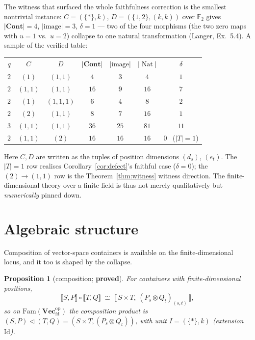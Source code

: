 \documentclass[11pt]{article}
\theoremstyle{plain}
\newtheorem{proposition}{Proposition}
\theoremstyle{definition}
\theoremstyle{remark}
\newcommand{\Vecfd}{\mathbf{Vec}_{\mathrm{fd}}}
\newcommand{\Fam}{\mathrm{Fam}}
\newcommand{\Cont}{\mathbf{Cont}}
\newcommand{\ext}[1]{\llbracket #1 \rrbracket}
\renewcommand{\lhd}{\vartriangleleft}
\newcommand{\op}{\mathrm{op}}
\DeclareMathOperator{\Nat}{Nat}
\begin{document}
The witness that surfaced the whole faithfulness correction is the smallest nontrivial instance:
$C=(\{\ast\},k)$, $D=(\{1,2\},(k,k))$ over $\mathbb F_2$ gives $|\Cont|=4$, $|\mathrm{image}|=3$,
$\delta=1$ --- two of the four morphisms (the two zero maps with $u=1$ vs.\ $u=2$) collapse to one
natural transformation (Langer, Ex.~5.4). A sample of the verified table:

\begin{center}\small
\renewcommand{\arraystretch}{1.15}
\begin{tabular}{@{}c c c c c c c@{}}
\toprule
$q$ & $C$ & $D$ & $|\Cont|$ & $|\mathrm{image}|$ & $|\Nat|$ & $\delta$\\
\midrule
$2$ & $(1)$   & $(1,1)$   & $4$  & $3$  & $4$  & $1$\\
$2$ & $(1,1)$ & $(1,1)$   & $16$ & $9$  & $16$ & $7$\\
$2$ & $(1)$   & $(1,1,1)$ & $6$  & $4$  & $8$  & $2$\\
$2$ & $(2)$   & $(1,1)$   & $8$  & $7$  & $16$ & $1$\\
$3$ & $(1,1)$ & $(1,1)$   & $36$ & $25$ & $81$ & $11$\\
$2$ & $(1,1)$ & $(2)$     & $16$ & $16$ & $16$ & $0$ \ ($|T|{=}1$)\\
\bottomrule
\end{tabular}
\end{center}

\noindent Here $C,D$ are written as the tuples of position dimensions $(d_s)$, $(e_t)$. The
$|T|=1$ row realises Corollary~\ref{cor:defect}'s faithful case ($\delta=0$); the $(2)\to(1,1)$
row is the Theorem~\ref{thm:witness} witness direction. The finite-dimensional theory over a
finite field is thus not merely qualitatively but \emph{numerically} pinned down.

\section{Algebraic structure}
\label{sec:algebra}

Composition of vector-space containers is available on the finite-dimensional locus, and it too is
shaped by the collapse.

\begin{proposition}[composition; \textbf{proved}]
\label{prop:comp}
For containers with finite-dimensional positions,
\[
   \ext{S,P}\circ\ext{T,Q}\;\cong\;\ext{\,S\times T,\ (P_s\otimes Q_t)_{(s,t)}\,},
\]
so on $\Fam(\Vecfd^\op)$ the composition product is
$(S,P)\lhd(T,Q)=(S\times T,(P_s\otimes Q_t))$, with unit $I=(\{\ast\},k)$ (extension $\mathrm{Id}$).
\end{proposition}
\end{document}
